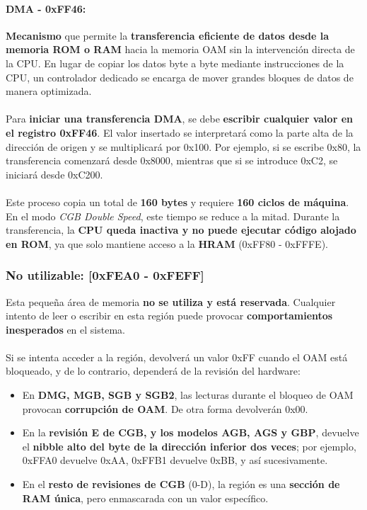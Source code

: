 \label{dma}
\paragraph{DMA - 0xFF46:} \textbf{Mecanismo} que permite la \textbf{transferencia eficiente de datos desde la memoria ROM o RAM} hacia la memoria OAM sin la intervención directa de la CPU. En lugar de copiar los datos byte a byte mediante instrucciones de la CPU, un controlador dedicado se encarga de mover grandes bloques de datos de manera optimizada.
\\\\
Para \textbf{iniciar una transferencia DMA}, se debe \textbf{escribir cualquier valor en el registro 0xFF46}. El valor insertado se interpretará como la parte alta de la dirección de origen y se multiplicará por 0x100. Por ejemplo, si se escribe 0x80, la transferencia comenzará desde 0x8000, mientras que si se introduce 0xC2, se iniciará desde 0xC200.
\\\\
Este proceso copia un total de \textbf{160 bytes} y requiere \textbf{160 ciclos de máquina}. En el modo \textit{CGB Double Speed}, este tiempo se reduce a la mitad. Durante la transferencia, la \textbf{CPU queda inactiva y no puede ejecutar código alojado en ROM}, ya que solo mantiene acceso a la \textbf{HRAM} (0xFF80 - 0xFFFE).


\subsubsection{No utilizable: [0xFEA0 - 0xFEFF]}
Esta pequeña área de memoria \textbf{no se utiliza y está reservada}. Cualquier intento de leer o escribir en esta región puede provocar \textbf{comportamientos inesperados} en el sistema.
\\\\
Si se intenta acceder a la región, devolverá un valor 0xFF cuando el OAM está bloqueado, y de lo contrario, dependerá de la revisión del hardware:

\begin{itemize}
    \item En \textbf{DMG, MGB, SGB y SGB2}, las lecturas durante el bloqueo de OAM provocan \textbf{corrupción de OAM}. De otra forma devolverán 0x00.
    \item En la \textbf{revisión E de CGB, y los modelos AGB, AGS y GBP}, devuelve el \textbf{nibble alto del byte de la dirección inferior dos veces}; por ejemplo, 0xFFA0 devuelve 0xAA, 0xFFB1 devuelve 0xBB, y así sucesivamente.
    \item En el \textbf{resto de revisiones de CGB} (0-D), la región es una \textbf{sección de RAM única}, pero enmascarada con un valor específico.
\end{itemize}

